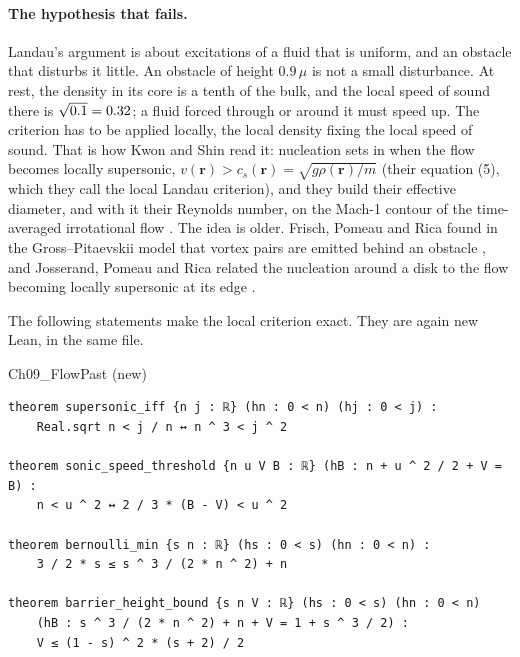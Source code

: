 \paragraph{The hypothesis that fails.} Landau's argument is about excitations of a fluid that is uniform, and an obstacle that disturbs it little. An obstacle of height $0.9\,\mu$ is not a small disturbance. At rest, the density in its core is a tenth of the bulk, and the local speed of sound there is $\sqrt{0.1}=0.32$; a fluid forced through or around it must speed up. The criterion has to be applied locally, the local density fixing the local speed of sound. That is how Kwon and Shin read it: nucleation sets in when the flow becomes locally supersonic, $v(\mathbf r)>c_s(\mathbf r)=\sqrt{g\rho(\mathbf r)/m}$ (their equation (5), which they call the local Landau criterion), and they build their effective diameter, and with it their Reynolds number, on the Mach-1 contour of the time-averaged irrotational flow \cite{KwonShin2026prr}. The idea is older. Frisch, Pomeau and Rica found in the Gross--Pitaevskii model that vortex pairs are emitted behind an obstacle \cite{FrischPomeauRica1992}, and Josserand, Pomeau and Rica related the nucleation around a disk to the flow becoming locally supersonic at its edge \cite{JosserandPomeauRica1999}.

The following statements make the local criterion exact. They are again new Lean, in the same file.

\begin{leanbox}[title={Lean 4 \enspace FlowPast (new for this book)}]{Ch09\_FlowPast (new)}
\begin{lstlisting}[style=lean]
theorem supersonic_iff {n j : ℝ} (hn : 0 < n) (hj : 0 < j) :
    Real.sqrt n < j / n ↔ n ^ 3 < j ^ 2

theorem sonic_speed_threshold {n u V B : ℝ} (hB : n + u ^ 2 / 2 + V = B) :
    n < u ^ 2 ↔ 2 / 3 * (B - V) < u ^ 2

theorem bernoulli_min {s n : ℝ} (hs : 0 < s) (hn : 0 < n) :
    3 / 2 * s ≤ s ^ 3 / (2 * n ^ 2) + n

theorem barrier_height_bound {s n V : ℝ} (hs : 0 < s) (hn : 0 < n)
    (hB : s ^ 3 / (2 * n ^ 2) + n + V = 1 + s ^ 3 / 2) :
    V ≤ (1 - s) ^ 2 * (s + 2) / 2
\end{lstlisting}
\end{leanbox}

